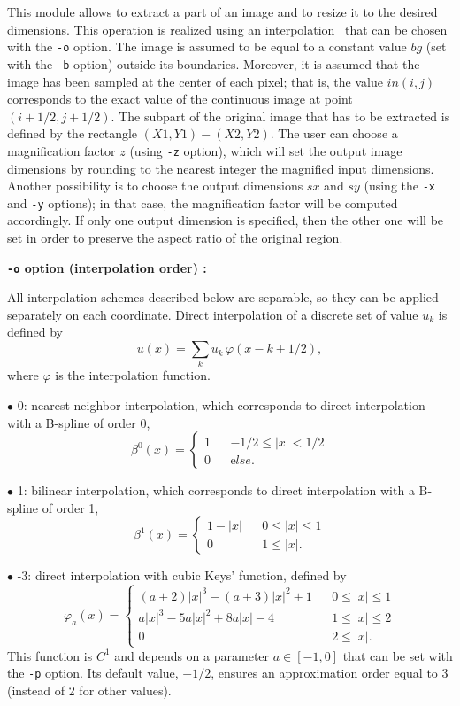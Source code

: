 This module allows to extract a part of an image and to resize it to
the desired dimensions. This operation is realized using an 
interpolation~\cite{thevenaz.blu.ea:image}\cite{unser.aldroubi.ea:fast}
that can be chosen with the \verb+-o+ option. The image is assumed
to be equal to a constant value $bg$ (set with the \verb+-b+ option)
outside its boundaries. Moreover, it is assumed that the image
has been sampled at the center of each pixel; that is, the value 
$in(i,j)$ corresponds to the exact value of the continuous image
at point $(i+1/2,j+1/2)$. The subpart of the original image that has
to be extracted is defined by the rectangle $(X1,Y1)-(X2,Y2)$. The user
can choose a magnification factor $z$ (using \verb+-z+ option), 
which will set the output image dimensions by rounding to the nearest 
integer the magnified input dimensions. Another possibility is to choose 
the output dimensions $sx$ and $sy$ (using the \verb+-x+ and \verb+-y+ 
options); in that case, the magnification factor will be computed 
accordingly. If only one output dimension is specified, then the other
one will be set in order to preserve the aspect ratio of the original 
region.

\medskip

{\bf \verb+-o+ option (interpolation order) :} 

\smallskip

All interpolation schemes described below are separable, so they can
be applied separately on each coordinate. Direct interpolation of 
a discrete set of value $u_k$ is defined by 
$$u(x) = \sum_k u_k \,\varphi(x-k+1/2),$$
where $\varphi$ is the interpolation function.

$\bullet$ 0: nearest-neighbor interpolation, which corresponds to direct 
interpolation with a B-spline of order 0,
$$\beta^0(x) = \left\{\begin{array}{lcl}
1       & & -1/2 \leq |x| < 1/2 \\ 
0       & & {\mathrm else}.
\end{array}\right.$$

$\bullet$ 1: bilinear interpolation, which corresponds to direct interpolation
with a B-spline of order 1,
$$\beta^1(x) = \left\{\begin{array}{lcl}
1-|x|   & & 0 \leq |x| \leq 1 \\ 
0       & & 1 \leq |x|.
\end{array}\right.$$

$\bullet$ -3: direct interpolation with cubic Keys' function, defined by
$$\varphi_a(x) = \left\{\begin{array}{lcl}
(a+2)|x|^3 - (a+3)|x|^2+1       & & 0 \leq |x| \leq 1 \\ 
a|x|^3 - 5a|x|^2+8a|x|-4        & & 1 \leq |x| \leq 2 \\ 
0                               & & 2 \leq |x|.
\end{array}\right.$$
This function is $C^1$ and depends on a parameter $a \in [-1,0]$ that 
can be set with the \verb+-p+ option. Its default value, $-1/2$,
ensures an approximation order equal to 3 (instead of 2 for other
values).

